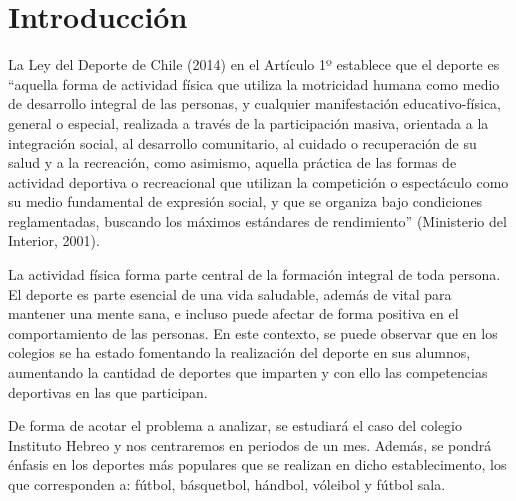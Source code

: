 \section{Introducción}

\indent  La Ley del Deporte de Chile (2014) en el Artículo 1º establece que el deporte es ``aquella forma de actividad física que utiliza la motricidad humana como medio de desarrollo integral de las personas, y cualquier manifestación educativo-física, general o especial, realizada a través de la participación masiva, orientada a la integración social, al desarrollo comunitario, al cuidado o recuperación de su salud y a la recreación, como asimismo, aquella práctica de las formas de actividad deportiva o recreacional que utilizan la competición o espectáculo como su medio fundamental de expresión social, y que se organiza bajo condiciones reglamentadas, buscando los máximos estándares de rendimiento'' (Ministerio del Interior, 2001). 

\indent La actividad física forma parte central de la formación integral de toda persona. El deporte es parte esencial de una vida saludable, además de vital para mantener una mente sana, e incluso puede afectar de forma positiva en el comportamiento de las personas. En este contexto, se puede observar que en los colegios se ha estado fomentando la realización del deporte en sus alumnos, aumentando la cantidad de deportes que imparten y con ello las competencias deportivas en las que participan. 

\indent De forma de acotar el problema a analizar, se estudiará el caso del colegio Instituto Hebreo y nos centraremos en periodos de un mes. Además, se pondrá énfasis en los deportes más populares que se realizan en dicho establecimento, los que corresponden a: fútbol, básquetbol, hándbol, vóleibol y fútbol sala.